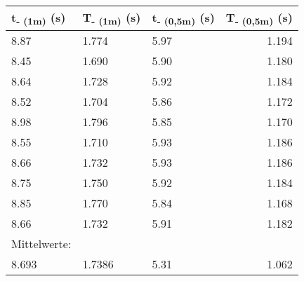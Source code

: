 \documentclass[titlepage=firstcover, captions=tableheading]{scrartcl}
\begin{document}
\begin{minipage}{\linewidth}
    \centering
    \begin{tabular}{lllr}
        \toprule 
        t\textsubscript{- (1m)} (s) & T\textsubscript{- (1m)} (s) 
        & t\textsubscript{- (0,5m)} (s) & T\textsubscript{- (0,5m)} (s) \\
        \midrule
        8.87 & 1.774 & 5.97 & 1.194 \\
        8.45 & 1.690 & 5.90 & 1.180 \\
        8.64 & 1.728 & 5.92 & 1.184 \\
        8.52 & 1.704 & 5.86 & 1.172 \\
        8.98 & 1.796 & 5.85 & 1.170 \\
        8.55 & 1.710 & 5.93 & 1.186 \\
        8.66 & 1.732 & 5.93 & 1.186 \\
        8.75 & 1.750 & 5.92 & 1.184 \\
        8.85 & 1.770 & 5.84 & 1.168 \\
        8.66 & 1.732 & 5.91 & 1.182 \\
        \midrule
        Mittelwerte:\\
        8.693 & 1.7386 & 5.31 & 1.062\\
        
        \bottomrule
        
    \end{tabular}
\end{minipage}

\leavevmode
\newline
\vspace*{1 cm}
\newline
\end{document}
